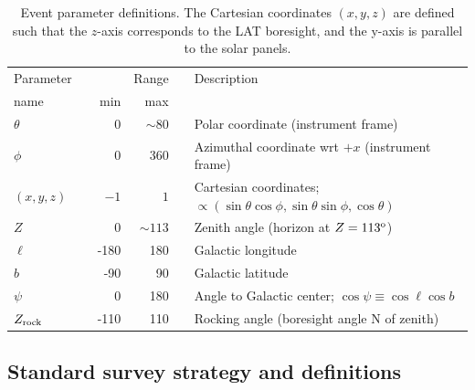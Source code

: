 \documentclass[aps,twocolumn,prd,superscriptaddress,showpacs,nofootinbib,fixfloat]{revtex4}
\newcommand{\degree}{^{\rm o}}
\newcommand{\zrock}{$Z_{\rm rock}$}
\begin{document}
\begin{table}
  \begin{center}
    \begin{tabular}{lcrrcl}
      \hline
      Parameter &\hphantom{i}& & Range &\hphantom{i}&  Description\\
      name      && min & max &&            \\
      \hline
      $\theta$ &&    0 &  $\sim80$ && Polar coordinate (instrument frame) \\
      $\phi$   &&    0 &       360 && Azimuthal coordinate wrt $+x$ (instrument frame) \\
      $(x,y,z)$&&  $-1$& $1$ && Cartesian coordinates;
      $\propto(\sin\theta\cos\phi, \sin\theta\sin\phi, \cos\theta)$\\
      $Z$      &&    0 & $\sim113$ && Zenith angle (horizon at $Z=113\degree$) \\
      $\ell$   && -180 & 180 && Galactic longitude \\
      $b$      &&  -90 &  90 && Galactic latitude \\
      $\psi$   &&    0 & 180 && Angle to Galactic center; $\cos\psi\equiv\cos\ell\cos b$ \\
      \zrock\  && -110 & 110 && Rocking angle (boresight angle N of zenith) \\
      \hline
    \end{tabular}
    \caption{Event parameter definitions. The Cartesian coordinates $(x, y, z)$ are
    defined such that the $z$-axis corresponds to the LAT boresight, and the
    y-axis is parallel to the solar panels.}
    \label{tab:parameters}
  \end{center}
\end{table}

\subsection{Standard survey strategy and definitions}
\label{sec:conventions}





\end{document}
